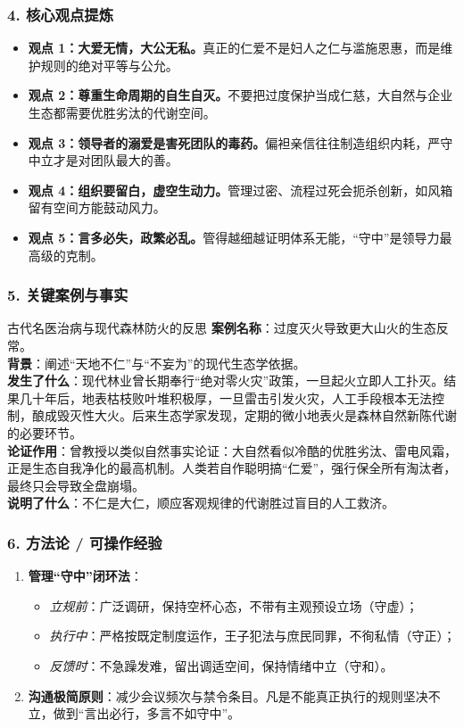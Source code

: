 \subsubsection{4. 核心观点提炼}
\begin{itemize}
    \item \textbf{观点 1：大爱无情，大公无私。}真正的仁爱不是妇人之仁与滥施恩惠，而是维护规则的绝对平等与公允。
    \item \textbf{观点 2：尊重生命周期的自生自灭。}不要把过度保护当成仁慈，大自然与企业生态都需要优胜劣汰的代谢空间。
    \item \textbf{观点 3：领导者的溺爱是害死团队的毒药。}偏袒亲信往往制造组织内耗，严守中立才是对团队最大的善。
    \item \textbf{观点 4：组织要留白，虚空生动力。}管理过密、流程过死会扼杀创新，如风箱留有空间方能鼓动风力。
    \item \textbf{观点 5：言多必失，政繁必乱。}管得越细越证明体系无能，“守中”是领导力最高级的克制。
\end{itemize}

\subsubsection{5. 关键案例与事实}
\begin{CaseBox}{古代名医治病与现代森林防火的反思}
\textbf{案例名称}：过度灭火导致更大山火的生态反常。\\
\textbf{背景}：阐述“天地不仁”与“不妄为”的现代生态学依据。\\
\textbf{发生了什么}：现代林业曾长期奉行“绝对零火灾”政策，一旦起火立即人工扑灭。结果几十年后，地表枯枝败叶堆积极厚，一旦雷击引发火灾，人工手段根本无法控制，酿成毁灭性大火。后来生态学家发现，定期的微小地表火是森林自然新陈代谢的必要环节。\\
\textbf{论证作用}：曾教授以类似自然事实论证：大自然看似冷酷的优胜劣汰、雷电风霜，正是生态自我净化的最高机制。人类若自作聪明搞“仁爱”，强行保全所有淘汰者，最终只会导致全盘崩塌。\\
\textbf{说明了什么}：不仁是大仁，顺应客观规律的代谢胜过盲目的人工救济。
\end{CaseBox}

\subsubsection{6. 方法论 / 可操作经验}
\begin{enumerate}
    \item \textbf{管理“守中”闭环法}：
    \begin{itemize}
        \item \emph{立规前}：广泛调研，保持空杯心态，不带有主观预设立场（守虚）；
        \item \emph{执行中}：严格按既定制度运作，王子犯法与庶民同罪，不徇私情（守正）；
        \item \emph{反馈时}：不急躁发难，留出调适空间，保持情绪中立（守和）。
    \end{itemize}
    \item \textbf{沟通极简原则}：减少会议频次与禁令条目。凡是不能真正执行的规则坚决不立，做到“言出必行，多言不如守中”。
\end{enumerate}

